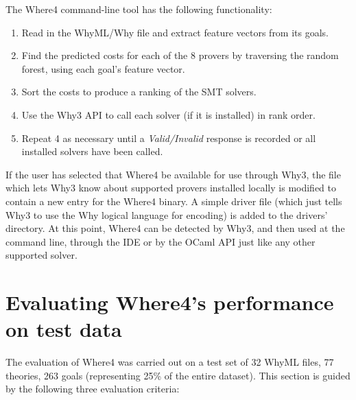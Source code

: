 \documentclass[runningheads,a4paper]{llncs}
\begin{document}
The \textsf{Where4} command-line tool has the following functionality:
\begin{enumerate}
\item Read in the WhyML/Why file and extract feature vectors from its goals.%
\item Find the predicted costs for each of the 8 provers by traversing the random forest, using each goal's feature vector.
\item Sort the costs to produce a ranking of the SMT solvers.
\item Use the \textsf{Why3} API to call each solver (if it is installed) in rank order.
\item Repeat 4 as necessary until a \textit{Valid/Invalid} response is recorded or all installed solvers have been called.
\end{enumerate}

If the user has selected that \textsf{Where4} be available for use through \textsf{Why3}, the file which lets \textsf{Why3} know about supported provers installed locally is modified to contain a new entry for the \textsf{Where4} binary. A simple driver file (which just tells \textsf{Why3} to use the Why logical language for encoding) is added to the drivers' directory. At this point, \textsf{Where4} can be detected by \textsf{Why3}, and then used at the command line, through the IDE or by the OCaml API just like any other supported solver. 

\section{Evaluating \textsf{Where4}'s performance on test data}
\label{sec:eval}



The evaluation of \textsf{Where4} was carried out on a test set of 32 WhyML files, 77 theories, 263 goals (representing 25\% of the entire dataset). This section is guided by the following three evaluation criteria:
\end{document}
